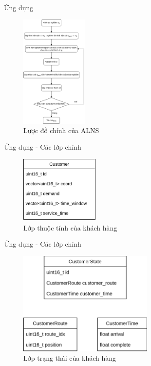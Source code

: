 \begin{frame}{Ứng dụng}
  \begin{figure}[H] %
    \centering %
    \includegraphics[width=0.3\textwidth]{figures/ALNS-flowchart.png} 
    \caption{Lược đồ chính của ALNS} 
  \end{figure}
\end{frame}

\begin{frame}{Ứng dụng - Các lớp chính}
  \begin{figure}[H] %
    \centering %
    \includegraphics[width=0.35\textwidth]{figures/Customer.png}
    \caption{Lớp thuộc tính của khách hàng}
    \label{fig:fg_02}
  \end{figure}
\end{frame}

\begin{frame}{Ứng dụng - Các lớp chính}
  \begin{figure}[H] %
    \centering %
    \includegraphics[width=0.6\textwidth]{figures/CustomerState.png}
    \caption{Lớp trạng thái của khách hàng}
    \label{fig:fg_03}
  \end{figure}
\end{frame}

